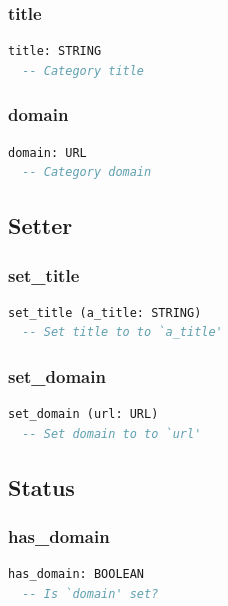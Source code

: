 \subsubsection{title}

\begin{lstlisting}[language=Eiffel]
title: STRING
  -- Category title
\end{lstlisting}

\subsubsection{domain}

\begin{lstlisting}[language=Eiffel]
domain: URL
  -- Category domain
\end{lstlisting}


\subsection{Setter}
\label{sec:category-setter}

\subsubsection{set\_title}

\begin{lstlisting}[language=Eiffel]
set_title (a_title: STRING)
  -- Set title to to `a_title'
\end{lstlisting}

\subsubsection{set\_domain}

\begin{lstlisting}[language=Eiffel]
set_domain (url: URL)
  -- Set domain to to `url'
\end{lstlisting}

\subsection{Status}
\label{sec:category-status}

\subsubsection{has\_domain}

\begin{lstlisting}[language=Eiffel]
has_domain: BOOLEAN
  -- Is `domain' set?
\end{lstlisting}

